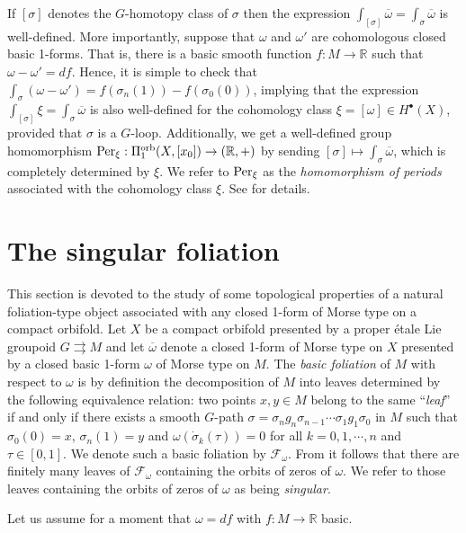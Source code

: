 \documentclass[
  a4paper, 
  reqno, 
  oneside, 
  12pt
]{amsart}
\theoremstyle{definition}
\theoremstyle{remark}
\newcommand{\rr}{\rightrightarrows}
\begin{document}
\noindent If $[\sigma]$ denotes the $G$-homotopy class of $\sigma$ then the expression $\int_{[\sigma]}\overline{\omega}=\int_{\sigma}\overline{\omega}$ is well-defined. More importantly, suppose that $\omega$ and $\omega'$ are cohomologous closed basic 1-forms. That is, there is a basic smooth function $f:M\to \mathbb{R}$ such that $\omega-\omega'=df$. Hence, it is simple to check that $\int_\sigma (\omega-\omega')=f(\sigma_n(1))-f(\sigma_0(0))$, implying that the expression $\int_{[\sigma]}\xi=\int_{\sigma}\overline{\omega}$ is also well-defined for the cohomology class $\xi=[\omega]\in H^\bullet(X)$, provided that $\sigma$ is a $G$-loop. Additionally, we get a well-defined group homomorphism $\textnormal{Per}_{\xi}:\Pi_1^\textnormal{orb}(X,[x_0])\to (\mathbb{R},+)$ by sending $[\sigma]\mapsto \int_{\sigma}\overline{\omega}$, which is completely determined by $\xi$. We refer to $\textnormal{Per}_{\xi}$ as the \emph{homomorphism of periods} associated with the cohomology class $\xi$. See \cite{V} for details.



\section{The singular foliation}\label{sec:3}

This section is devoted to the study of some topological properties of a natural foliation-type object associated with any closed 1-form of Morse type on a compact orbifold. Let $X$ be a compact orbifold presented by a proper étale Lie groupoid $G\rr M$ and let $\overline{\omega}$ denote a closed 1-form of Morse type on $X$ presented by a closed basic 1-form $\omega$ of Morse type on $M$. The \emph{basic foliation} of $M$ with respect to $\omega$ is by definition the decomposition of $M$ into leaves determined by the following equivalence relation: two points $x,y\in M$ belong to the same ``\emph{leaf}'' if and only if there exists a smooth $G$-path $\sigma=\sigma_ng_n\sigma_{n-1}\cdots \sigma_1g_1\sigma_0$ in $M$ such that $\sigma_0(0)=x$, $\sigma_n(1)=y$ and $\omega(\dot{\sigma}_k(\tau))=0$ for all $k=0,1,\cdots,n$ and $\tau\in [0,1]$. We denote such a basic foliation by $\mathcal{F}_\omega$. From \cite{OV,V} it follows that there are finitely many leaves of $\mathcal{F}_\omega$ containing the orbits of zeros of $\omega$. We refer to those leaves containing the orbits of zeros of $\omega$ as being \emph{singular}.
 
Let us assume for a moment that $\omega=df$ with $f:M\to \mathbb{R}$ basic. 
 
\end{document}
